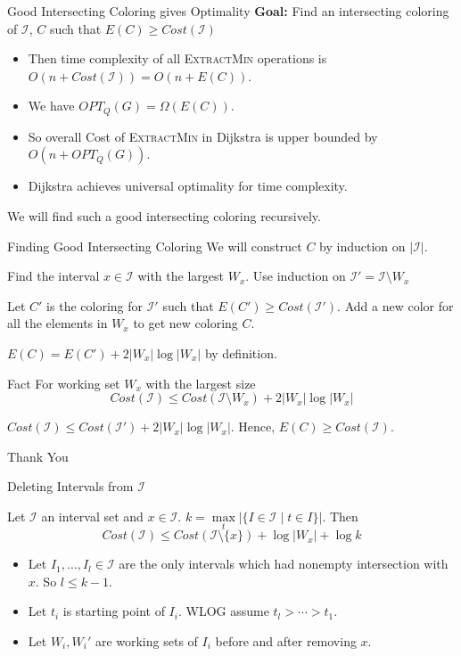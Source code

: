 \documentclass[10pt]{beamer}
\begin{document}
\begin{frame}{Good Intersecting Coloring gives Optimality}
	\textbf{Goal:} Find an intersecting coloring of $\mathcal{I}$, $C$ such that $E(C)\geq Cost(\mathcal{I})$\pause 

	\begin{itemize}
		\item Then time complexity of all \textsc{ExtractMin} operations is $O(n+Cost(\mathcal{I}))=O(n+E(C))$.\pause 
		\item We have  $OPT_Q(G)=\Omega (E(C))$.\pause 
		\item So overall Cost of \textsc{ExtractMin} in Dijkstra is upper bounded by $O(n+OPT_Q(G))$.\pause 
		\item Dijkstra achieves universal optimality for time complexity.\pause 
	\end{itemize}
	\vfill

	We will find such a good intersecting coloring recursively.
\end{frame}
\begin{frame}{Finding Good Intersecting Coloring}
	We will construct $C$ by induction on $|\mathcal{I}|$.\pause \setlength{\parindent}{1cm}

	Find the interval $x\in\mathcal{I}$ with the largest $W_x$. Use induction on $\mathcal{I}'=\mathcal{I}\setminus W_x$\pause 

	Let $C'$ is the coloring for $\mathcal{I}'$ such that $E(C')\geq Cost(\mathcal{I}')$. Add a new color for all the elements in $W_x$ to get new coloring $C$.\pause 

	$E(C)=E(C')+2|W_x|\log|W_x|$ by definition. \pause 
  
  \begin{alertblock}{Fact}
		For working set $W_x$ with the largest size $$Cost(\mathcal{I})\leq Cost(\mathcal{I}\setminus W_x)+2|W_x|\log |W_x|$$
	\end{alertblock}\pause 
  
  $Cost(\mathcal{I})\leq Cost(\mathcal{I}')+2|W_x|\log|W_x|$. Hence, $E(C)\geq Cost(\mathcal{I})$.
\end{frame}
\begin{frame}[standout]
	Thank You
\end{frame}
\begin{frame}{Deleting Intervals from $\mathcal{I}$}
	\begin{theorem}
		Let $\mathcal{I}$ an interval set and $x\in\mathcal{I}$. $k=\max\limits_t|\{I\in\mathcal{I}\mid t\in I\}|$. Then $$Cost(\mathcal{I})\leq Cost(\mathcal{I}\setminus \{x\})+\log |W_x|+\log k$$
	\end{theorem}\vfill

	\begin{itemize}
		\item Let $I_1,\dots, I_l\in\mathcal{I}$ are the only intervals which had nonempty intersection with $x$. So $l\leq k-1$.\vfill
		\item Let $t_i$ is starting point of $I_i$. WLOG assume $t_l>\cdots>t_1$.\vfill
		\item Let $W_i, W_i'$ are working sets of $I_i$ before and after removing $x$.
	\end{itemize}
\end{frame}
\end{document}
